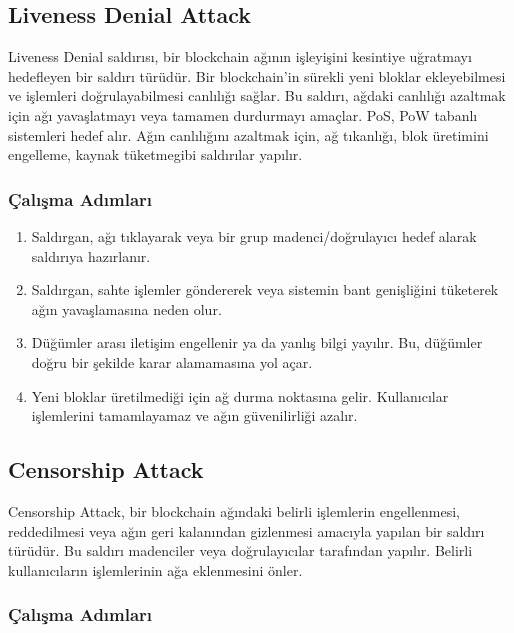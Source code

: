 \newpage

\subsection{Liveness Denial Attack}

Liveness Denial saldırısı, bir blockchain ağının işleyişini kesintiye uğratmayı hedefleyen bir saldırı türüdür. Bir blockchain'in sürekli yeni bloklar ekleyebilmesi ve işlemleri doğrulayabilmesi canlılığı sağlar. Bu saldırı, ağdaki canlılığı azaltmak için ağı yavaşlatmayı veya tamamen durdurmayı amaçlar. PoS, PoW tabanlı sistemleri hedef alır. Ağın canlılığını azaltmak için, ağ tıkanlığı, blok üretimini engelleme, kaynak tüketmegibi saldırılar yapılır.

\subsubsection{Çalışma Adımları}

\begin{enumerate}
    \item Saldırgan, ağı tıklayarak veya bir grup madenci/doğrulayıcı hedef alarak saldırıya hazırlanır.
    \item Saldırgan, sahte işlemler göndererek veya sistemin bant genişliğini tüketerek ağın yavaşlamasına neden olur.
    \item Düğümler arası iletişim engellenir ya da yanlış bilgi yayılır. Bu, düğümler doğru bir şekilde karar alamamasına yol açar.
    \item Yeni bloklar üretilmediği için ağ durma noktasına gelir. Kullanıcılar işlemlerini tamamlayamaz ve ağın güvenilirliği azalır.
\end{enumerate}

\newpage

\subsection{Censorship Attack}

Censorship Attack, bir blockchain ağındaki belirli işlemlerin engellenmesi, reddedilmesi veya ağın geri kalanından gizlenmesi amacıyla yapılan bir saldırı türüdür. Bu saldırı madenciler veya doğrulayıcılar tarafından yapılır. Belirli kullanıcıların işlemlerinin ağa eklenmesini önler.

\subsubsection{Çalışma Adımları}

